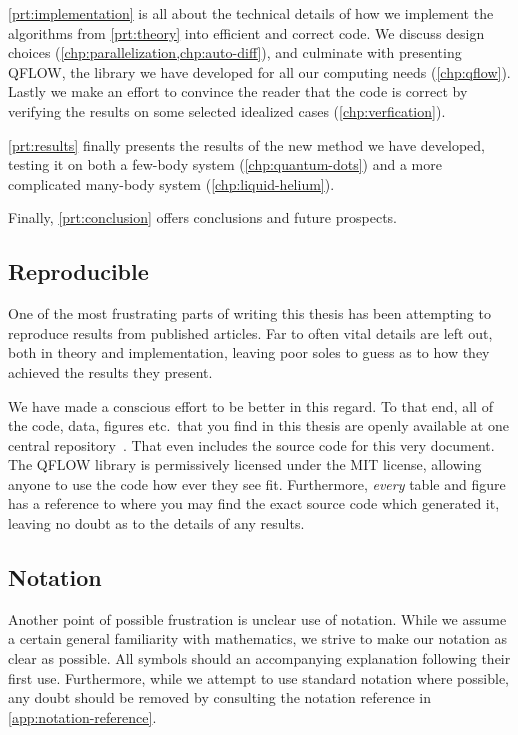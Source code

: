 \documentclass[Thesis.tex]{subfiles}
\begin{document}
\cref{prt:implementation} is all about the technical details of how we implement
the algorithms from \cref{prt:theory} into efficient and correct code. We
discuss design choices (\cref{chp:parallelization,chp:auto-diff}), and culminate
with presenting QFLOW, the library we have
developed for all our computing needs (\cref{chp:qflow}). Lastly we make an effort to convince the
reader that the code is correct by verifying the results on some
selected idealized cases (\cref{chp:verfication}).

\cref{prt:results} finally presents the results of the new method we have
developed, testing it on both a few-body system (\cref{chp:quantum-dots}) and a
more complicated many-body system (\cref{chp:liquid-helium}).

Finally, \cref{prt:conclusion} offers conclusions and future prospects.

\subsection*{Reproducible}

One of the most frustrating parts of writing this thesis has been attempting to
reproduce results from published articles. Far to often vital details are left
out, both in theory and implementation, leaving poor soles to guess as to how
they achieved the results they present.

We have made a conscious effort to be
better in this regard. To that end, all of the code, data, figures etc.\ that
you find in this thesis are openly available at one central
repository~\cite{qflow}. That even includes the source code for this very
document. The QFLOW library is permissively licensed under the MIT license,
allowing anyone to use the code how ever they see fit. Furthermore, \emph{every} table
and figure has a reference to where you may find the exact source code which
generated it, leaving no doubt as to the details of any results.

\subsection*{Notation}

Another point of possible frustration is unclear use of notation. While we
assume a certain general familiarity with mathematics, we strive to make our
notation as clear as possible. All symbols should an accompanying
explanation following their first use. Furthermore, while we attempt to use
standard notation where possible, any doubt should be removed by consulting the
notation reference in \cref{app:notation-reference}.
\end{document}
